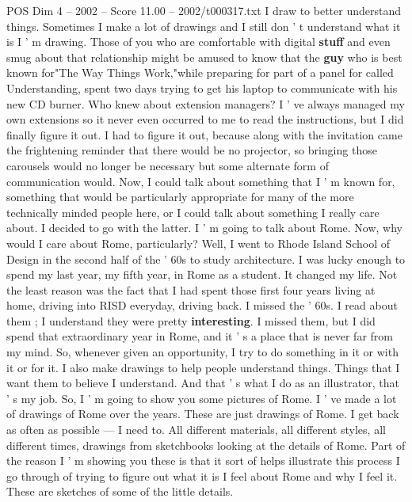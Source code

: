 \begin{textsample}{POS Dim 4 – 2002 – Score 11.00 – 2002/t000317.txt}  \label{ex:f4_pos_026}
I draw to better understand things.
Sometimes I make a lot of drawings and I still don ' t understand what it is I ' m drawing.
Those of you who are comfortable with digital \textbf{stuff} and even smug about that relationship might be amused to know that the \textbf{guy} who is best known for"The Way Things Work,"while preparing for part of a panel for called Understanding, spent two days trying to get his laptop to communicate with his new CD burner.
Who knew about extension managers?
I ' ve always managed my own extensions so it never even occurred to me to read the instructions, but I did finally figure it out.
I had to figure it out, because along with the invitation came the frightening reminder that there would be no projector, so bringing those carousels would no longer be necessary but some alternate form of communication would.
Now, I could talk about something that I ' m known for, something that would be particularly appropriate for many of the more technically minded people here, or I could talk about something I really care about.
I decided to go with the latter.
I ' m going to talk about Rome.
Now, why would I care about Rome, particularly?
Well, I went to Rhode Island School of Design in the second half of the ' 60s to study architecture.
I was lucky enough to spend my last year, my fifth year, in Rome as a student.
It changed my life.
Not the least reason was the fact that I had spent those first four years living at home, driving into RISD everyday, driving back.
I missed the ' 60s.
I read about them ; I understand they were pretty \textbf{interesting}.
I missed them, but I did spend that extraordinary year in Rome, and it ' s a place that is never far from my mind.
So, whenever given an opportunity, I try to do something in it or with it or for it.
I also make drawings to help people understand things.
Things that I want them to believe I understand.
And that ' s what I do as an illustrator, that ' s my job.
So, I ' m going to show you some pictures of Rome.
I ' ve made a lot of drawings of Rome over the years.
These are just drawings of Rome.
I get back as often as possible — I need to.
All different materials, all different styles, all different times, drawings from sketchbooks looking at the details of Rome.
Part of the reason I ' m showing you these is that it sort of helps illustrate this process I go through of trying to figure out what it is I feel about Rome and why I feel it.
These are sketches of some of the little details.

\end{textsample}
